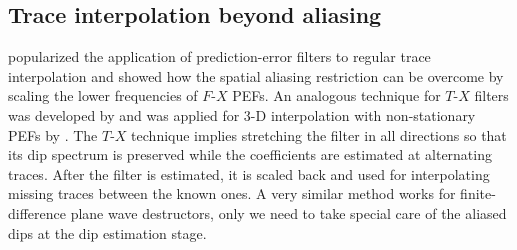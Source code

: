 \begin{comment}
\inputdir{seab}

\plot{seab}{width=6in,height=3.5in}{Depth of the ocean from SeaBeam
  measurements.  Left plot: after binning. Right plot: after binning
  and gap interpolation.}
\par
A 3-D interpolation example is shown in Figure~\ref{fig:passfill}. The
input data resulted from a passive seismic experiment
\cite[]{Cole.sepphd.86} and originally contained many gaps because of
instrument failure. I interpolated the 3-D gaps with a pair of two
orthogonal plane-wave destructors in the manner proposed by
\cite{Schwab.sep.84.271} for $T$-$X$ prediction filters. The
interpolation result shows a visually pleasing continuation of locally
plane events through the gaps. It compares favorably with an analogous
result of a stationary $T$-$X$ PEF.

\inputdir{blast}

\plot{passfill}{width=6in,height=3.5in}{3-D gap interpolation in
  passive seismic data. The left 12 panels are slices of the input
  data.  The right 12 panels are the corresponding slices in the
  interpolation output.}
\par
We can conclude that plane-wave destructors provide an effective
method of gap filling and missing data interpolation.
\end{comment}

\subsection{Trace interpolation beyond aliasing}


\cite{GEO56-06-07850794} popularized the application of
prediction-error filters to regular trace interpolation and showed how
the spatial aliasing restriction can be overcome by scaling the
lower frequencies of $F$-$X$ PEFs. An analogous technique for $T$-$X$
filters was developed by \cite{Claerbout.blackwell.92,gee} and
was applied for 3-D interpolation with non-stationary PEFs by
\cite{Crawley.sepphd.104}. The $T$-$X$ technique implies
stretching the filter in all directions so that its dip spectrum is
preserved while the coefficients are estimated at alternating
traces. After the filter is estimated, it is scaled back and used for
interpolating missing traces between the known ones.  A very
similar method works for finite-difference plane wave destructors,
only we need to take special care of the aliased dips at the dip
estimation stage.


